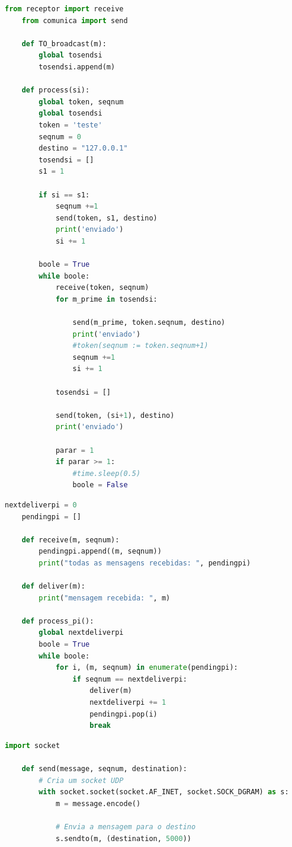 \documentclass[10pt,conference]{IEEEtran}
\begin{document}
\begin{lstlisting}[language=Python, caption= Código do Emissor]
    from receptor import receive
    from comunica import send
    
    def TO_broadcast(m):
        global tosendsi
        tosendsi.append(m)
    
    def process(si):
        global token, seqnum
        global tosendsi
        token = 'teste'
        seqnum = 0
        destino = "127.0.0.1"
        tosendsi = []
        s1 = 1
    
        if si == s1:
            seqnum +=1
            send(token, s1, destino)
            print('enviado')
            si += 1
            
        boole = True
        while boole:
            receive(token, seqnum)
            for m_prime in tosendsi:
                
                send(m_prime, token.seqnum, destino)
                print('enviado')
                #token(seqnum := token.seqnum+1) 
                seqnum +=1 
                si += 1
                  
            tosendsi = []
       
            send(token, (si+1), destino)
            print('enviado')
            
            parar = 1
            if parar >= 1:
                #time.sleep(0.5)
                boole = False
\end{lstlisting}

\begin{lstlisting}[language=Python, caption=Código do Receptor]
    nextdeliverpi = 0
    pendingpi = []
    
    def receive(m, seqnum):
        pendingpi.append((m, seqnum))
        print("todas as mensagens recebidas: ", pendingpi)
    
    def deliver(m):
        print("mensagem recebida: ", m)
    
    def process_pi():
        global nextdeliverpi
        boole = True
        while boole:
            for i, (m, seqnum) in enumerate(pendingpi):
                if seqnum == nextdeliverpi:
                    deliver(m)
                    nextdeliverpi += 1
                    pendingpi.pop(i)
                    break
\end{lstlisting}

\begin{lstlisting}[language=Python, caption=Código de Envio de Mensagem]
    import socket

    def send(message, seqnum, destination):
        # Cria um socket UDP
        with socket.socket(socket.AF_INET, socket.SOCK_DGRAM) as s:
            m = message.encode()
    
            # Envia a mensagem para o destino
            s.sendto(m, (destination, 5000))    
\end{lstlisting}
\end{document}

